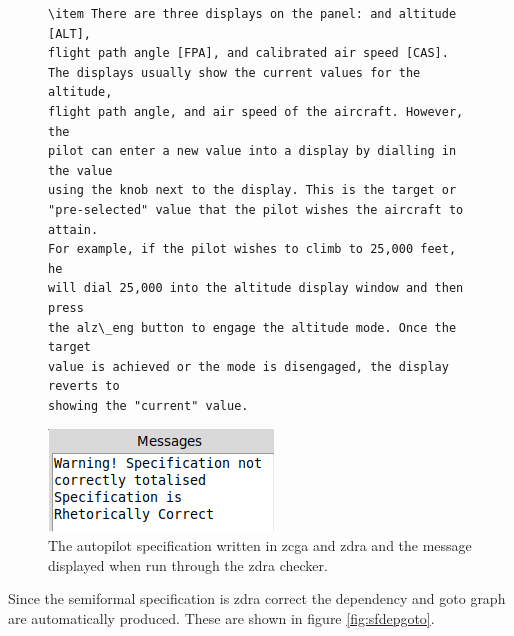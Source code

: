 \begin{figure}[H]
\begin{minipage}{0.45\textwidth}
\begin{tiny}
\begin{BVerbatim}[commandchars=+\[\]]
\item There are three displays on the panel: and altitude [ALT],
flight path angle [FPA], and calibrated air speed [CAS]. 
The displays usually show the current values for the altitude, 
flight path angle, and air speed of the aircraft. However, the 
pilot can enter a new value into a display by dialling in the value 
using the knob next to the display. This is the target or 
"pre-selected" value that the pilot wishes the aircraft to attain. 
For example, if the pilot wishes to climb to 25,000 feet, he 
will dial 25,000 into the altitude display window and then press 
the alz\_eng button to engage the altitude mode. Once the target 
value is achieved or the mode is disengaged, the display reverts to 
showing the "current" value.

 \end{BVerbatim}
 \end{tiny}
 \includegraphics[scale=0.5]{Figures/fullexample/sfzdramessage.png}
 \caption{The autopilot specification written in \gls{zcga} and \gls{zdra} and the message displayed when run through the \gls{zdra} checker.\label{fig:sfzdrazcgaout}}
 \end{minipage}
 \end{figure}

Since the semiformal specification is \gls{zdra} correct the dependency and goto
graph are automatically produced. These are shown in figure \ref{fig:sfdepgoto}.


